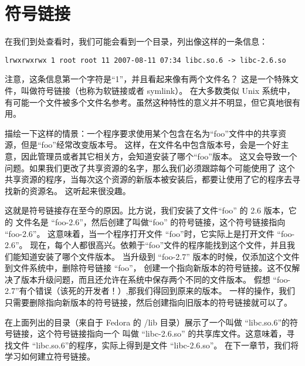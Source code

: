 \section{符号链接} %
\label{sec:符号链接}

在我们到处查看时，我们可能会看到一个目录，列出像这样的一条信息：
\begin{lstlisting}
lrwxrwxrwx 1 root root 11 2007-08-11 07:34 libc.so.6 -> libc-2.6.so 
\end{lstlisting}

\par 注意，这条信息第一个字符是``1''，并且看起来像有两个文件名？ 这是一个特殊文件，叫做符号链接（也称为软链接或者 symlink）。 在大多数类似 Unix 系统中，有可能一个文件被多个文件名参考。虽然这种特性的意义并不明显，但它真地很有用。

\par 描绘一下这样的情景：一个程序要求使用某个包含在名为``foo''文件中的共享资源，但是``foo''经常改变版本号。 这样，在文件名中包含版本号，会是一个好主意，因此管理员或者其它相关方，会知道安装了哪个``foo''版本。 这又会导致一个问题。如果我们更改了共享资源的名字，那么我们必须跟踪每个可能使用了 这个共享资源的程序，当每次这个资源的新版本被安装后，都要让使用了它的程序去寻找新的资源名。 这听起来很没趣。

\par 这就是符号链接存在至今的原因。比方说，我们安装了文件``foo'' 的 2.6 版本，它的 文件名是 ``foo-2.6''，然后创建了叫做``foo'' 的符号链接，这个符号链接指向 ``foo-2.6''。 这意味着，当一个程序打开文件 ``foo''时，它实际上是打开文件 ``foo-2.6''。 现在，每个人都很高兴。依赖于``foo''文件的程序能找到这个文件，并且我们能知道安装了哪个文件版本。 当升级到 ``foo-2.7'' 版本的时候，仅添加这个文件到文件系统中，删除符号链接 “foo”， 创建一个指向新版本的符号链接。这不仅解决了版本升级问题，而且还允许在系统中保存两个不同的文件版本。 假想 ``foo-2.7''有个错误（该死的开发者！）,那我们得回到原来的版本。 一样的操作，我们只需要删除指向新版本的符号链接，然后创建指向旧版本的符号链接就可以了。

\par 在上面列出的目录（来自于 Fedora 的 /lib 目录）展示了一个叫做 ``libc.so.6''的符号链接，这个符号链接指向一个 叫做 “libc-2.6.so” 的共享库文件。这意味着，寻找文件 ``libc.so.6''的程序，实际上得到是文件 ``libc-2.6.so''。 在下一章节，我们将学习如何建立符号链接。


